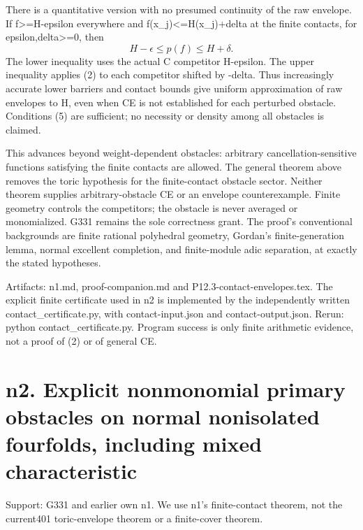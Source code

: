 \documentclass[11pt]{article}
\begin{document}
There is a quantitative version with no presumed continuity of the raw envelope. If f>=H-epsilon everywhere and f(x\_j)<=H(x\_j)+delta at the finite contacts, for epsilon,delta>=0, then
\[
 H-\epsilon\le p(f)\le H+\delta.                           \tag{6}
\]
The lower inequality uses the actual C competitor H-epsilon. The upper inequality applies (2) to each competitor shifted by -delta. Thus increasingly accurate lower barriers and contact bounds give uniform approximation of raw envelopes to H, even when CE is not established for each perturbed obstacle. Conditions (5) are sufficient; no necessity or density among all obstacles is claimed.

This advances beyond weight-dependent obstacles: arbitrary cancellation-sensitive functions satisfying the finite contacts are allowed. The general theorem above removes the toric hypothesis for the finite-contact obstacle sector. Neither theorem supplies arbitrary-obstacle CE or an envelope counterexample. Finite geometry controls the competitors; the obstacle is never averaged or monomialized. G331 remains the sole correctness grant. The proof's conventional backgrounds are finite rational polyhedral geometry, Gordan's finite-generation lemma, normal excellent completion, and finite-module adic separation, at exactly the stated hypotheses.

Artifacts: n1.md, proof-companion.md and P12.3-contact-envelopes.tex. The explicit finite certificate used in n2 is implemented by the independently written contact\_certificate.py, with contact-input.json and contact-output.json. Rerun: python contact\_certificate.py. Program success is only finite arithmetic evidence, not a proof of (2) or of general CE.


\section{n2. Explicit nonmonomial primary obstacles on normal nonisolated fourfolds, including mixed characteristic}

Support: G331 and earlier own n1. We use n1's finite-contact theorem, not the current401 toric-envelope theorem or a finite-cover theorem.
\end{document}
